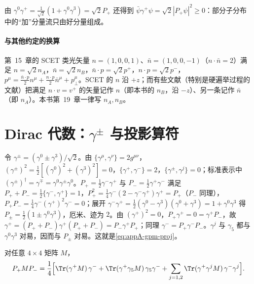 由 $\gamma^0\gamma^+=\frac1{\sqrt2}(1+\gamma^0\gamma^3)=\sqrt2P_+$ 还得到 $\bar\psi\gamma^+\psi=\sqrt2|P_+\psi|^2\ge0$：部分子分布中的“加”分量流只由好分量组成。

\paragraph{与其他约定的换算}
第~15~章的 SCET 类光矢量 $n=(1,0,0,1)$、$\bar n=(1,0,0,-1)$（$n\cdot\bar n=2$）满足 $n=\sqrt2n_A$，$\bar n=\sqrt2n_B$，$\bar n\cdot p=\sqrt2p^+$，$n\cdot p=\sqrt2p^-$，$p^\mu=\frac{\bar n\cdot p}2n^\mu+\frac{n\cdot p}2\bar n^\mu+p_\perp^\mu$。SCET 的 $n$ 沿 $+z$；而有些文献（特别是硬遍举过程的文献）把满足 $n\cdot v=v^+$ 的矢量记作 $n$（即本书的 $n_B$，沿 $-z$）、另一条记作 $\bar n$（即 $n_A$）。本书第~19~章一律写 $n_A,n_B$。

\section{Dirac 代数：$\gamma^\pm$ 与投影算符}\label{sec:appA-dirac}

令 $\gamma^\pm=(\gamma^0\pm\gamma^3)/\sqrt2$。由 $\{\gamma^\mu,\gamma^\nu\}=2g^{\mu\nu}$，$(\gamma^\pm)^2=\frac12[(\gamma^0)^2+(\gamma^3)^2]=0$，$\{\gamma^+,\gamma^-\}=2$，$\{\gamma^\pm,\gamma^j\}=0$；标准表示中 $(\gamma^\pm)^\dagger=\gamma^\mp=\gamma^0\gamma^\pm\gamma^0$。$P_+=\frac12\gamma^-\gamma^+$ 与 $P_-=\frac12\gamma^+\gamma^-$ 满足 $P_++P_-=\frac12\{\gamma^-,\gamma^+\}=1$，$P_+^2=\frac14\gamma^-(2-\gamma^-\gamma^+)\gamma^+=P_+$（$P_-$ 同理），$P_+P_-=\frac14\gamma^-(\gamma^+)^2\gamma^-=0$；展开 $\gamma^-\gamma^+=\frac12(\gamma^0-\gamma^3)(\gamma^0+\gamma^3)=1+\gamma^0\gamma^3$ 得 $P_\pm=\frac12(1\pm\gamma^0\gamma^3)$，厄米、迹为 $2$。由 $(\gamma^+)^2=0$，$P_+\gamma^+=0=\gamma^+P_-$，故 $\gamma^+=(P_++P_-)\gamma^+(P_++P_-)=P_-\gamma^+P_+$；同理 $\gamma^-=P_+\gamma^-P_-$。$\gamma^j$ 与 $\gamma_5$ 都与 $\gamma^0\gamma^3$ 对易，因而与 $P_\pm$ 对易。这就是\cref{eq:appA-gpm-proj}。

\begin{lemma}[共线 Fierz 分解]\label{lem:appA-fierz}
对任意 $4\times4$ 矩阵 $M$，
\begin{equation}\label{eq:appA-fierz}
P_+MP_-=\frac14\Big[\Tr(\gamma^+M)\,\gamma^-+\Tr(\gamma^+\gamma_5M)\,\gamma_5\gamma^-+\sum_{j=1,2}\Tr(\gamma^+\gamma^jM)\,\gamma^-\gamma^j\Big]. %
\end{equation}
\end{lemma}

